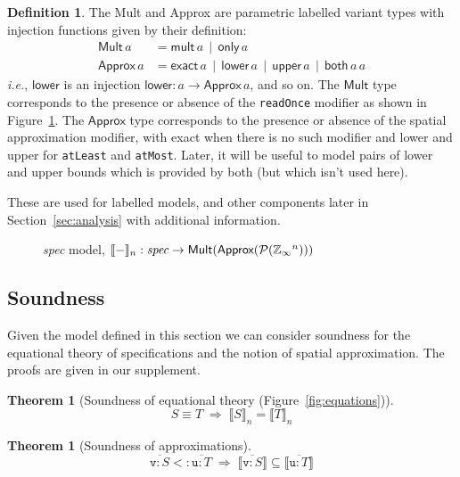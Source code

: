 \documentclass[9pt]{sigplanconf}
\newcounter{block}
\theoremstyle{definition}
\newtheorem{theorem}[block]{Theorem}
\newtheorem{definition}[block]{Definition}
\newcommand{\ie}{\emph{i.e.}}
\newcommand{\interp}[1]{\llbracket{#1}\rrbracket}
\newcommand{\term}[1]{\texttt{#1}}
\begin{document}
\begin{definition} The \textsf{Mult}
and \textsf{Approx} are parametric labelled variant types 
with injection functions given by their definition:
%
\begin{align*}
\textsf{Mult} \, a & = \textsf{mult} \, a \,\mid\, \textsf{only} \, a \\
\textsf{Approx} \, a & = \textsf{exact} \, a \,\mid\, \textsf{lower} \, a \,\mid\,
\textsf{upper} \, a \,\mid\, \textsf{both} \, a \, a
\end{align*}
\ie{}, $\mathsf{lower}$ is an injection $\mathsf{lower} : a \rightarrow \mathsf{Approx} \, a$, and so
on. The $\textsf{Mult}$ type corresponds to the presence or absence of the
\term{readOnce} modifier as shown in Figure~\ref{fig:spatial-model}. 
The $\textsf{Approx}$ type corresponds to the presence or absence of
the spatial approximation modifier, with \textsf{exact} when there is
no such modifier and \textsf{lower} and \textsf{upper} for
\term{atLeast} and \term{atMost}. Later, it will be useful to model
pairs of lower and upper bounds which is provided by \textsf{both} 
(but which isn't used here). 

These are used for labelled models, and other components later in
Section~\ref{sec:analysis} with additional information.
\label{def:mult-and-approx}
\end{definition}
%

\begin{figure}[t]

\caption{\textit{spec} model, 
$\interp{-}_n : \textit{spec} \rightarrow \textsf{Mult}(\textsf{Approx}(\mathcal{P}(\domainVal{}^n)))$}
\label{fig:spatial-model}
\vspace{-1em}
\end{figure}

\subsection{Soundness}

Given the model defined in this section we can
consider soundness for the equational theory of
specifications and the notion of spatial approximation. The proofs are given in our supplement.

\begin{theorem}[Soundness of equational theory (Figure~\ref{fig:equations})]
\[
S \equiv T \; \Rightarrow \;
\interp{S}_n = \interp{T}_n
\]
\end{theorem}

\begin{theorem}[Soundness of approximations]
\[
\overline{\texttt{v} : S} <: \overline{\texttt{u} : T}
\; \Rightarrow \;
\interp{\overline{\texttt{v} : S}} \subseteq \interp{\overline{\texttt{u} : T}}
\]
\end{theorem}
\end{document}
